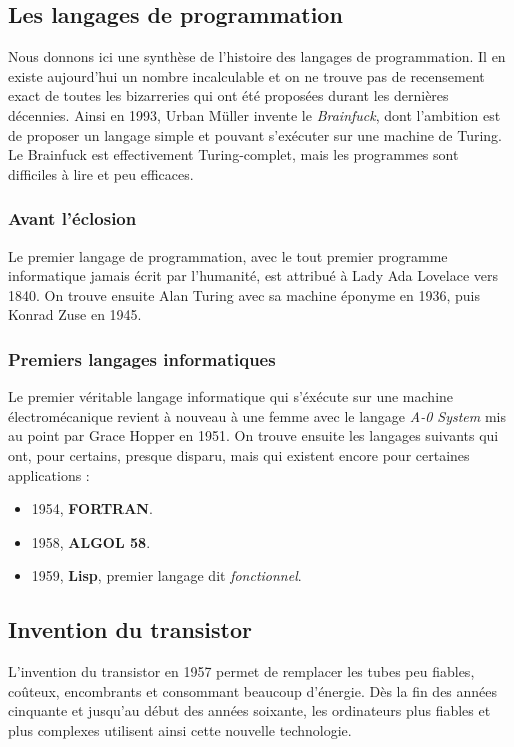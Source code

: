 \documentclass[a4paper,11pt]{book}
\begin{document}
\subsection{Les langages de programmation}
Nous donnons ici une synthèse de l'histoire des langages de programmation. Il en existe aujourd'hui un nombre incalculable et on ne trouve pas de recensement exact de toutes les bizarreries qui ont été proposées durant les dernières décennies. Ainsi en 1993, Urban Müller invente le \textit{Brainfuck}, dont l'ambition est de proposer un langage simple et pouvant s'exécuter sur une machine de Turing. Le Brainfuck est effectivement Turing-complet, mais les programmes sont difficiles à lire et peu efficaces.

\subsubsection{Avant l'éclosion}
Le premier langage de programmation, avec le tout premier programme informatique jamais écrit par l'humanité, est attribué à Lady Ada Lovelace vers 1840. On trouve ensuite Alan Turing avec sa machine éponyme en 1936, puis Konrad Zuse en 1945.
\subsubsection{Premiers langages informatiques}
Le premier véritable langage informatique qui s'éxécute sur une machine électromécanique revient à nouveau à une femme avec le langage \textit{A-0 System} mis au point par Grace Hopper en 1951.
On trouve ensuite les langages suivants qui ont, pour certains, presque disparu, mais qui existent encore pour certaines applications :
\begin{itemize}
    \item 1954, \textbf{FORTRAN}.
    \item 1958, \textbf{ALGOL 58}.
    \item 1959, \textbf{Lisp}, premier langage dit \textit{fonctionnel}.
\end{itemize}

\subsection{Invention du transistor}
L'invention du transistor en 1957 permet de remplacer les tubes peu fiables, coûteux, encombrants et consommant beaucoup d'énergie. Dès la fin des années cinquante et jusqu'au début des années soixante, les ordinateurs plus fiables et plus complexes utilisent ainsi cette nouvelle technologie.
\end{document}
